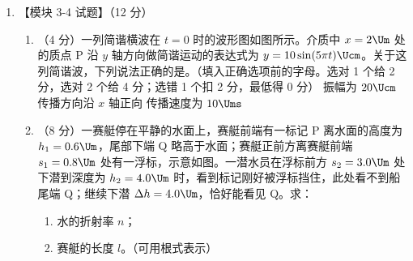 \documentclass[\gkver]{gaokaozhenti}
\begin{document}
\begin{enumerate}
{（2）由玻意耳定律得 $p_{1}V_{1}+p_{0}V_{2}=(p_{0}+\rho gh)(V_{1}+V_{2})$，$p_{1}=\frac{\rho gh(V_{1}+V_{2})+p_{0}V_{1}}{V_{1}}$。
}

\item
【模块 3-4 试题】（12 分）
\begin{enumerate}
	\item
	（4 分）一列简谐横波在 $t=0$ 时的波形图如图所示。介质中 $x=2\Um$ 处的质点 P 沿 $y$ 轴方向做简谐运动的表达式为 $y=10\sin(5\pi t)\Ucm$。关于这列简谐波，下列说法正确的是。（填入正确选项前的字母。选对 1 个给 2 分，选对 2 个给 4 分；选错 1 个扣 2 分，最低得 0 分）
	{振幅为 $20\Ucm$}
	{传播方向沿 $x$ 轴正向}
	{传播速度为 $10\Ums$}
	\item
	（8 分）一赛艇停在平静的水面上，赛艇前端有一标记 P 离水面的高度为 $h_{1}=0.6\Um$，尾部下端 Q 略高于水面；赛艇正前方离赛艇前端 $s_{1}=0.8\Um$ 处有一浮标，示意如图。一潜水员在浮标前方 $s_{2}=3.0\Um$ 处下潜到深度为 $h_{2}=4.0\Um$ 时，看到标记刚好被浮标挡住，此处看不到船尾端 Q；继续下潜 $\Delta h=4.0\Um$，恰好能看见 Q。求：
	\begin{enumerate}[label = (\roman*)]
		\item
		水的折射率 $n$；
		\item
		赛艇的长度 $l$。（可用根式表示）
	\end{enumerate}
\end{enumerate}

\end{enumerate}
\end{document}
